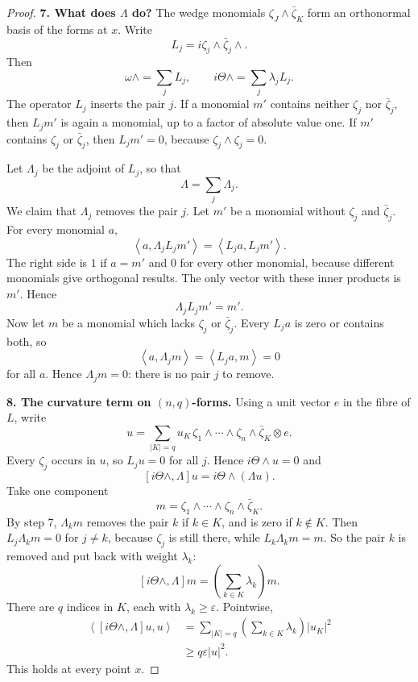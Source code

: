 \begin{proof}
\medskip\noindent
{\bf 7. What does $\Lambda$ do?}
The wedge monomials
$\zeta_J\wedge\bar\zeta_K$ form an
orthonormal basis of the forms at $x$.
Write
$$
L_j=i\zeta_j\wedge\bar\zeta_j\wedge.
$$
Then
$$
\omega\wedge=\sum_jL_j,
\qquad
i\Theta\wedge=\sum_j\lambda_jL_j.
$$
The operator $L_j$ inserts the pair $j$.
If a monomial $m'$ contains neither
$\zeta_j$ nor $\bar\zeta_j$, then
$L_jm'$ is again a monomial, up to a
factor of absolute value one. If $m'$
contains $\zeta_j$ or $\bar\zeta_j$,
then $L_jm'=0$, because
$\zeta_j\wedge\zeta_j=0$.

Let $\Lambda_j$ be the adjoint of $L_j$,
so that
$$
\Lambda=\sum_j\Lambda_j.
$$
We claim that $\Lambda_j$ removes the
pair $j$. Let $m'$ be a monomial without
$\zeta_j$ and $\bar\zeta_j$. For every
monomial $a$,
$$
\left\langle{}
a,\Lambda_jL_jm'\right\rangle{}
=\left\langle{}
L_ja,L_jm'\right\rangle{}.
$$
The right side is $1$ if $a=m'$ and
$0$ for every other monomial, because
different monomials give orthogonal
results. The only vector with these
inner products is $m'$. Hence
$$
\Lambda_jL_jm'=m'.
$$
Now let $m$ be a monomial which lacks
$\zeta_j$ or $\bar\zeta_j$. Every
$L_ja$ is zero or contains both, so
$$
\left\langle{}
a,\Lambda_jm\right\rangle{}
=\left\langle{}
L_ja,m\right\rangle{}=0
$$
for all $a$. Hence $\Lambda_jm=0$: there
is no pair $j$ to remove.

\medskip\noindent
{\bf 8. The curvature term on
$(n,q)$-forms.}
Using a unit vector $e$ in the fibre of
$L$, write
$$
u=\sum_{|K|=q}u_K\,
\zeta_1\wedge\cdots\wedge\zeta_n
\wedge\bar\zeta_K\otimes e.
$$
Every $\zeta_j$ occurs in $u$, so
$L_ju=0$ for all $j$. Hence
$i\Theta\wedge u=0$ and
$$
[i\Theta\wedge,\Lambda]u
=i\Theta\wedge(\Lambda u).
$$
Take one component
$$
m=\zeta_1\wedge\cdots\wedge\zeta_n
\wedge\bar\zeta_K.
$$
By step 7, $\Lambda_km$ removes the
pair $k$ if $k\in K$, and is zero if
$k\notin K$. Then $L_j\Lambda_km=0$ for
$j\neq k$, because $\zeta_j$ is still
there, while $L_k\Lambda_km=m$. So the
pair $k$ is removed and put back with
weight $\lambda_k$:
$$
[i\Theta\wedge,\Lambda]m
=\left(\sum_{k\in K}\lambda_k\right)m.
$$
There are $q$ indices in $K$, each with
$\lambda_k\geq\varepsilon$. Pointwise,
$$
\begin{aligned}
\left\langle{}
[i\Theta\wedge,\Lambda]u,u
\right\rangle{}
&=\sum_{|K|=q}
\left(\sum_{k\in K}\lambda_k\right)
|u_K|^2\\
&\geq q\varepsilon|u|^2.
\end{aligned}
$$
This holds at every point $x$.


\end{proof}
